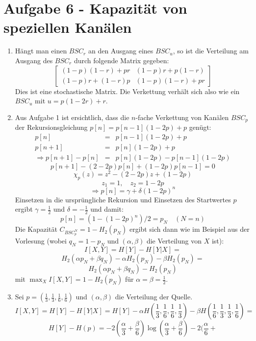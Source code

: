 \section*{Aufgabe 6 - Kapazität von speziellen Kanälen}
\begin{enumerate}
\item
	Hängt man einen $BSC_{r}$ an den Ausgang eines $BSC_{u}$, so ist die
	Verteilung am Ausgang des $BSC_{r}$ durch folgende Matrix gegeben:
	\[ \begin{bmatrix}(1-p)(1-r)+pr&(1-p)r+p(1-r)\\(1-p)r+(1-r)p&(1-p)(1-r)+pr\end{bmatrix} \]
	Dies ist eine stochastische Matrix. Die Verkettung verhält sich also
	wie ein $BSC_{u}$ mit $u = p(1-2r)+r$.
\item
	Aus Aufgabe 1 ist ersichtlich, dass die $n$-fache Verkettung von
	Kanälen $BSC_{p}$ der Rekursionsgleichung $p[n] = p[n-1](1-2p)+p$ genügt:
	\begin{eqnarray*} 
		p[n] &=& p[n-1](1-2p)+p \\
		p[n+1] &=& p[n](1-2p)+p \\
		\Rightarrow p[n+1] - p[n] &=& p[n](1-2p)-p[n-1](1-2p)
	\end{eqnarray*}
	\[ p[n+1] - (2-2p)p[n] + (1-2p)p[n-1] = 0 \]
	\[ \chi_{p}(z) = z^{2} - (2-2p)z + (1-2p) \]
	\[ z_{1} = 1, \quad z_{2} = 1-2p\]
	\[ \Rightarrow p[n] = \gamma + \delta(1-2p)^{n} \]
	Einsetzen in die ursprüngliche Rekursion und Einsetzen des Startwertes
	$p$ ergibt $\gamma = \frac{1}{2}$ und $\delta = -\frac{1}{2}$ und damit:
	\[ p[n] = (1 - (1-2p)^{n})/2 = p_{N} \quad (N = n) \]
	Die Kapazität $C_{BSC_{p}^{N}} = 1 - H_{2}(p_{N})$ ergibt sich dann wie
	im Beispiel aus der Vorlesung (wobei $q_{N} = 1 - p_{N}$ und $(\alpha,
	\beta)$ die Verteilung von $X$ ist):
	\[ I[X,Y] = H[Y] - H[Y|X] = \]
	\[ H_{2}(\alpha p_{N} + \beta q_{N}) - \alpha H_{2}(p_{N}) - \beta H_{2}(p_{N}) = \]
	\[ H_{2}(\alpha p_{N} + \beta q_{N}) - H_{2}(p_{N}) \]
	mit $\max_{X} I[X,Y] = 1 - H_{2}(p_{N})$ für $\alpha = \beta = \frac{1}{2}$.
\item
	Sei $p = (\frac{1}{3}, \frac{1}{3}, \frac{1}{6}, \frac{1}{6})$ und
	$(\alpha, \beta)$ die Verteilung der Quelle.
	\[ I[X,Y] = H[Y] - H[Y|X] = H[Y] - \alpha H(\frac{1}{3}, \frac{1}{6},
	\frac{1}{6}, \frac{1}{3}) - \beta H(\frac{1}{6}, \frac{1}{3}, \frac{1}{3},
	\frac{1}{6}) = \]
	\[ H[Y] - H(p) = -2(\frac{\alpha}{3} + \frac{\beta}{6})
	\log(\frac{\alpha}{3} + \frac{\beta}{6}) - 2(\frac{\alpha}{6} +
\]
\end{enumerate}
